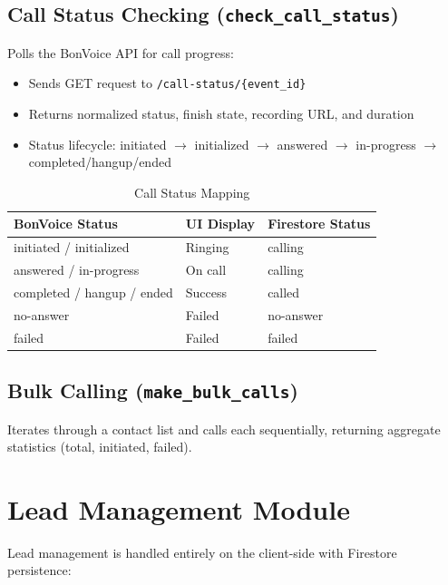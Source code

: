 \documentclass[12pt,a4paper,oneside]{book}
\begin{document}
\subsection{Call Status Checking (\texttt{check\_call\_status})}

Polls the BonVoice API for call progress:
\begin{itemize}
    \item Sends GET request to \texttt{/call-status/\{event\_id\}}
    \item Returns normalized status, finish state, recording URL, and duration
    \item Status lifecycle: initiated $\rightarrow$ initialized $\rightarrow$ answered $\rightarrow$ in-progress $\rightarrow$ completed/hangup/ended
\end{itemize}

\begin{table}[H]
\centering
\caption{Call Status Mapping}
\label{tab:statusmap}
\begin{tabular}{|l|l|l|}
\hline
\textbf{BonVoice Status} & \textbf{UI Display} & \textbf{Firestore Status} \\
\hline
initiated / initialized & Ringing & calling \\
answered / in-progress & On call & calling \\
completed / hangup / ended & Success & called \\
no-answer & Failed & no-answer \\
failed & Failed & failed \\
\hline
\end{tabular}
\end{table}

\subsection{Bulk Calling (\texttt{make\_bulk\_calls})}

Iterates through a contact list and calls each sequentially, returning aggregate statistics (total, initiated, failed).

\section{Lead Management Module}

Lead management is handled entirely on the client-side with Firestore persistence:
\end{document}
